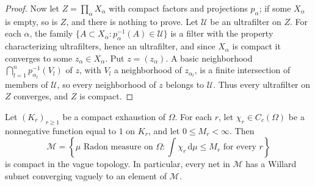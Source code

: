 \begin{proof}
Now let $Z=\prod_\alpha X_\alpha$ with compact factors and projections $p_\alpha$; if some $X_\alpha$ is empty, so is $Z$, and there is nothing to prove. Let $\mathcal U$ be an ultrafilter on $Z$. For each $\alpha$, the family $\{A\subset X_\alpha:p_\alpha^{-1}(A)\in\mathcal U\}$ is a filter with the property characterizing ultrafilters, hence an ultrafilter, and since $X_\alpha$ is compact it converges to some $z_\alpha\in X_\alpha$. Put $z=(z_\alpha)$. A basic neighborhood $\bigcap_{l=1}^np_{\alpha_l}^{-1}(V_l)$ of $z$, with $V_l$ a neighborhood of $z_{\alpha_l}$, is a finite intersection of members of $\mathcal U$, so every neighborhood of $z$ belongs to $\mathcal U$. Thus every ultrafilter on $Z$ converges, and $Z$ is compact.
\end{proof}

\begin{theorem}\label{thm:local-measure-compactness}
Let $(K_r)_{r\geq1}$ be a compact exhaustion of $\Omega$. For each $r$, let $\chi_r\in C_c(\Omega)$ be a nonnegative function equal to $1$ on $K_r$, and let $0\leq M_r<\infty$. Then
\[
 \mathcal M=\left\{\mu\text{ Radon measure on }\Omega:\int\chi_r\,\mathrm d\mu\leq M_r\text{ for every }r\right\}
\]
is compact in the vague topology. In particular, every net in $\mathcal M$ has a Willard subnet converging vaguely to an element of $\mathcal M$.
\end{theorem}
